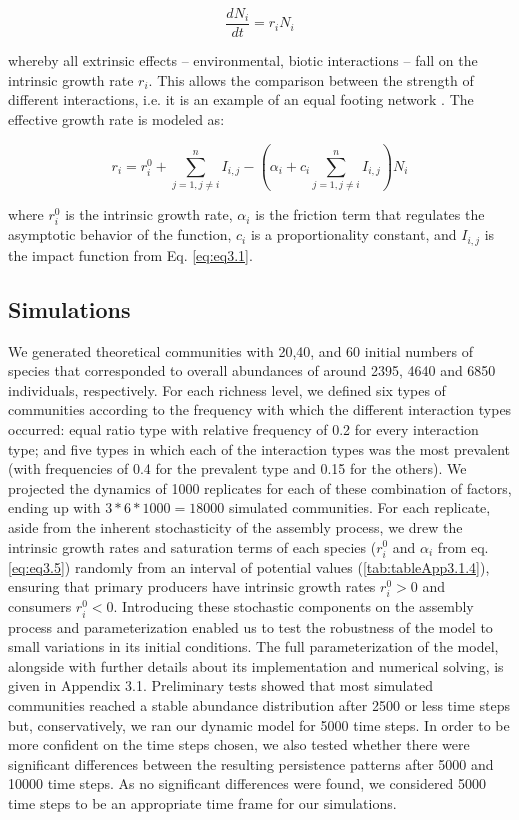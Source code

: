 \begin{equation} \label{eq:eq3.4}
\frac{dN_i}{dt} = r_i N_i
\end{equation}

whereby all extrinsic effects – environmental, biotic interactions – fall on the intrinsic growth rate $r_i$. This allows the comparison between the strength of different interactions, i.e. it is an example of an equal footing network \citep{Garcia-Callejas2018}. The effective growth rate is modeled as:

\begin{equation} \label{eq:eq3.5}
r_i=r_i^0+\sum_{j=1,j{\neq}i}^n I_{i,j} - (\alpha_i + c_i \sum_{j=1,j{\neq}i}^{n} I_{i,j})N_i
\end{equation}

where $r_{i}^{0}$ is the intrinsic growth rate, $\alpha_i$ is the friction term that regulates the asymptotic behavior of the function, $c_i$ is a proportionality constant, and $I_{i,j}$ is the impact function from Eq. \ref{eq:eq3.1}.

\subsection*{Simulations}

We generated theoretical communities with 20,40, and 60 initial numbers of species that corresponded to overall abundances of around 2395, 4640 and 6850 individuals, respectively. For each richness level, we defined six types of communities according to the frequency with which the different interaction types occurred: equal ratio type with relative frequency of 0.2 for every interaction type; and five types in which each of the interaction types was the most prevalent (with frequencies of 0.4 for the prevalent type and 0.15 for the others). We projected the dynamics of 1000 replicates for each of these combination of factors, ending up with $3*6*1000 = 18000$ simulated communities. For each replicate, aside from the inherent stochasticity of the assembly process, we drew the intrinsic growth rates and saturation terms of each species ($r_{i}^{0}$ and $\alpha_i$ from eq. \ref{eq:eq3.5}) randomly from an interval of potential values (\cref{tab:tableApp3.1.4}), ensuring that primary producers have intrinsic growth rates $r_{i}^{0} > 0$ and consumers $r_{i}^{0} < 0$. Introducing these stochastic components on the assembly process and parameterization enabled us to test the robustness of the model to small variations in its initial conditions. The full parameterization of the model, alongside with further details about its implementation and numerical solving, is given in Appendix 3.1. Preliminary tests showed that most simulated communities reached a stable abundance distribution after 2500 or less time steps but, conservatively, we ran our dynamic model for 5000 time steps. In order to be more confident on the time steps chosen, we also tested whether there were significant differences between the resulting persistence patterns after 5000 and 10000 time steps. As no significant differences were found, we considered 5000 time steps to be an appropriate time frame for our simulations.

